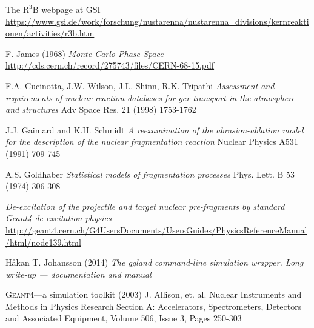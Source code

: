 \documentclass[12pt, a4paper]{article}
\newcommand{\rtb}{\ensuremath{\text{R}^3\text{B}}}
\begin{document}
\begin{thebibliography}{9}
 The \rtb{} webpage at GSI \url{https://www.gsi.de/work/forschung/nustarenna/nustarenna_divisions/kernreaktionen/activities/r3b.htm}

 F. James (1968) \emph{Monte Carlo Phase Space}
\url{http://cds.cern.ch/record/275743/files/CERN-68-15.pdf}






 F.A. Cucinotta, J.W. Wilson, J.L. Shinn, R.K. Tripathi \emph{Assessment and requirements of nuclear reaction databases for gcr transport in the atmosphere and structures} Adv Space Res. 21 (1998) 1753-1762



 J.J. Gaimard and K.H. Schmidt \emph{A reexamination of the abrasion-ablation model for the description of the nuclear fragmentation reaction} Nuclear Physics A531 (1991) 709-745

 A.S. Goldhaber \emph{Statistical models of fragmentation processes} Phys. Lett. B 53 (1974) 306-308

 \emph{De-excitation of the projectile and target nuclear pre-fragments by standard Geant4 de-excitation physics } \url{http://geant4.cern.ch/G4UsersDocuments/UsersGuides/PhysicsReferenceManual/html/node139.html}

 Håkan T. Johansson (2014) \emph{The ggland command-line simulation wrapper. Long write-up — documentation and manual}

 \textsc{Geant4}---a simulation toolkit (2003) J. Allison, et. al. Nuclear Instruments and Methods in Physics Research Section A: Accelerators, Spectrometers, Detectors and Associated Equipment, Volume 506, Issue 3, Pages 250-303




\end{thebibliography}
\end{document}

